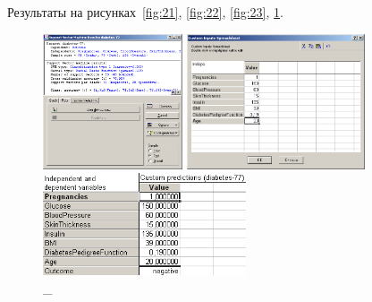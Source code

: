 Результаты на рисунках~\ref{fig:21}, \ref{fig:22}, \ref{fig:23}, \ref{fig:24}.

\begin{figure}[!h]
  \centering

  \begin{minipage}{0.32\textwidth}
    \centering

    \includegraphics[height=4cm]
    {inc/v5_21.PNG}

    \caption{\_}

    \label{fig:21}
  \end{minipage}
  \begin{minipage}{0.32\textwidth}
    \centering

    \includegraphics[height=4cm]
    {inc/v5_22.PNG}

    \caption{\_}

    \label{fig:22}
  \end{minipage}
  \begin{minipage}{0.32\textwidth}
    \centering

    \includegraphics[width=6cm]
    {inc/v5_24.PNG}

    \caption{\_}

    \label{fig:24}
  \end{minipage}
\end{figure}
